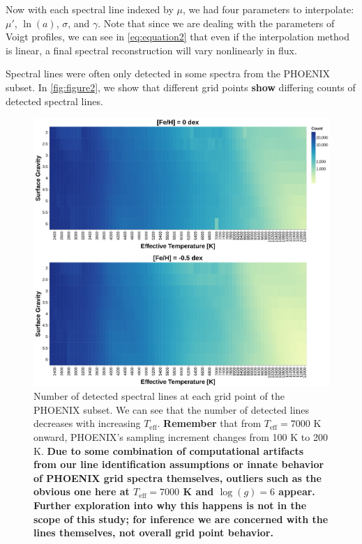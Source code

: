 \documentclass[twocolumn, linenumbers]{aastex631}
\begin{document}
Now with each spectral line indexed by $\mu$, we had four parameters to interpolate: $\mu'$, $\ln(a)$, $\sigma$, and $\gamma$.
Note that since we are dealing with the parameters of Voigt profiles, we can see in \autoref{eq:equation2} that even if the interpolation method is linear, a final spectral reconstruction will vary nonlinearly in flux.

Spectral lines were often only detected in some spectra from the PHOENIX subset.
In \autoref{fig:figure2}, we show that different grid points \textbf{show} differing counts of detected spectral lines.
\begin{figure}
    \centering
    \includegraphics[width=\textwidth]{figure2}
    \caption{Number of detected spectral lines at each grid point of the PHOENIX subset.
    We can see that the number of detected lines decreases with increasing $T_{\mathrm{eff}}$.
    \textbf{Remember} that from $T_{\mathrm{eff}} = 7000$ K onward, PHOENIX's sampling increment changes from 100 K to 200 K.
    \textbf{Due to some combination of computational artifacts from our line identification assumptions or innate behavior of PHOENIX grid spectra themselves, outliers such as the obvious one here at $T_{\mathrm{eff}} = 7000$ K and $\log(g) = 6$ appear.
    Further exploration into why this happens is not in the scope of this study; for inference we are concerned with the lines themselves, not overall grid point behavior.}}
    \label{fig:figure2}
\end{figure}
\end{document}
